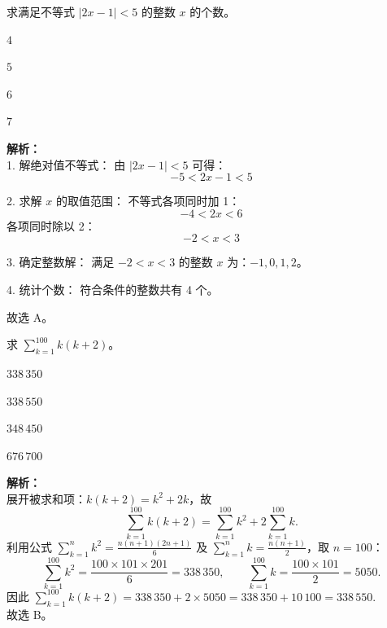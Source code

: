 \documentclass[12pt,a4paper]{exam-zh}
\begin{document}
\begin{question}
    求满足不等式 $|2x-1|<5$ 的整数 $x$ 的个数。
    \begin{choices}
        \item $4$
        \item $5$
        \item $6$
        \item $7$
    \end{choices}
\end{question}
\begin{solution}
    \textbf{解析：} \\
    1. 解绝对值不等式：
    由 $|2x-1|<5$ 可得：
    \[ -5 < 2x - 1 < 5 \]
    
    2. 求解 $x$ 的取值范围：
    不等式各项同时加 1：
    \[ -4 < 2x < 6 \]
    各项同时除以 2：
    \[ -2 < x < 3 \]
    
    3. 确定整数解：
    满足 $-2 < x < 3$ 的整数 $x$ 为：$-1, 0, 1, 2$。
    
    4. 统计个数：
    符合条件的整数共有 4 个。
    
    故选 A。
\end{solution}


\begin{question}
    求 $\displaystyle\sum_{k=1}^{100}k(k+2)$。\paren[B]
    \begin{choices}
        \item $338\,350$ \item $338\,550$ \item $348\,450$ \item $676\,700$
    \end{choices}
\end{question}

\begin{solution}
    \textbf{解析：} \\
    展开被求和项：$k(k+2)=k^2+2k$，故
    \[
        \sum_{k=1}^{100}k(k+2)=\sum_{k=1}^{100}k^2+2\sum_{k=1}^{100}k.
    \]
    利用公式 $\displaystyle\sum_{k=1}^{n}k^2=\frac{n(n+1)(2n+1)}{6}$ 及 $\displaystyle\sum_{k=1}^{n}k=\frac{n(n+1)}{2}$，取 $n=100$：
    \[
        \sum_{k=1}^{100}k^2=\frac{100\times101\times201}{6}=338\,350,\qquad
        \sum_{k=1}^{100}k=\frac{100\times101}{2}=5050.
    \]
    因此 $\displaystyle\sum_{k=1}^{100}k(k+2)=338\,350+2\times5050=338\,350+10\,100=338\,550$. \\
    故选 B。
\end{solution}
\end{document}
